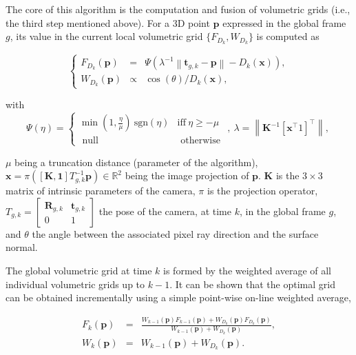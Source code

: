 The core of this algorithm is the computation and fusion of volumetric grids (i.e., the third step mentioned above). For a 3D point $\mathbf{p}$ expressed in the global frame $g$, its value in the current local volumetric grid $\{F_{D_k},W_{D_k}\}$ is computed as

$$
\left\{
\begin{array}{ccc}
F_{D_{k}}(\mathbf{p}) &=& \Psi (\lambda^{-1} \left \| \mathbf{t}_{g,k} - \mathbf{p}\right \| - D_k(\mathbf{x})), \\
W_{D_{k}}(\mathbf{p}) &\propto& \cos(\theta)/D_{k}(\mathbf{x}),
\end{array}
\right.
$$

with
$$
\Psi (\eta) =
\left \{
\begin{array}{cc}
\min(1,\frac{\eta}{\mu}) ~\text{sgn}(\eta) & \text{iff} ~ \eta \geq -\mu \\
\mbox{ null } & \mbox{ otherwise }
\end{array}
\right. , ~
\lambda = \left \| \mathbf{K}^{-1} [\mathbf{x}^\top 1]^\top \right \|,~
$$

$\mu$ being a truncation distance (parameter of the algorithm), $\mathbf{x} = \pi([\mathbf{K},\mathbf 1] T^{-1}_{g,k} \mathbf{p}) \in \mathbb{R}^2$ being the image projection of $\mathbf p$. $\mathbf{K}$ is the $3\times 3$ matrix of intrinsic parameters of the camera, $\pi$ is the projection operator, $T_{g,k} = \left[ \begin{matrix} \mathbf{R}_{g,k} & \mathbf{t}_{g,k} \\ 0 & 1 \end{matrix} \right]$ the pose of the camera, at time $k$, in the global frame $g$, and $\theta$ the angle between the associated pixel ray direction and the surface normal.

The global volumetric grid at time $k$ is formed by the weighted average of all individual volumetric grids up to $k-1$. It can be shown that the optimal grid can be obtained incrementally using a simple point-wise on-line weighted average,

\begin{eqnarray*}
 F_k(\mathbf{p}) &=& \frac{W_{k-1}(\mathbf{p}) F_{k-1}(\mathbf{p}) + W_{D_{k}}(\mathbf{p}) F_{D_{k}}(\mathbf{p}) }{ W_{k-1}(\mathbf{p}) + W_{D_{k}}(\mathbf{p}) }, \\
 W_k(\mathbf{p}) &=& W_{k-1}(\mathbf{p}) + W_{D_{k}}(\mathbf{p}).
\end{eqnarray*}


